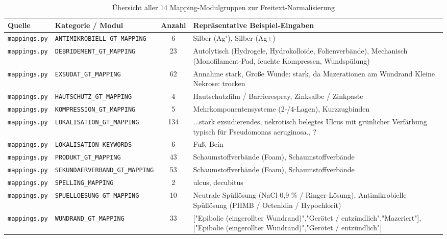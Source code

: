 \begin{table}[h!]
\centering
\caption{Übersicht aller 14 Mapping-Modulgruppen zur Freitext-Normalisierung}
\label{tab:mapping_uebersicht}
\begin{tabular}{|l|l|c|p{6cm}|}
\hline
\textbf{Quelle} & \textbf{Kategorie / Modul} & \textbf{Anzahl} & \textbf{Repräsentative Beispiel-Eingaben} \\ \hline
\texttt{mappings.py} & \texttt{ANTIMIKROBIELL\_GT\_MAPPING} & 6 & \small{Silber (Ag⁺), Silber (Ag+)} \\ \hline
\texttt{mappings.py} & \texttt{DEBRIDEMENT\_GT\_MAPPING} & 23 & \small{Autolytisch (Hydrogele, Hydrokolloide, Folienverbände), Mechanisch (Monofilament-Pad, feuchte Kompressen, Wundspülung)} \\ \hline
\texttt{mappings.py} & \texttt{EXSUDAT\_GT\_MAPPING} & 62 & \small{Annahme stark, Große Wunde: stark, da Mazerationen am Wundrand
Kleine Nekrose: trocken} \\ \hline
\texttt{mappings.py} & \texttt{HAUTSCHUTZ\_GT\_MAPPING} & 4 & \small{Hautschutzfilm / Barrierespray, Zinksalbe / Zinkpaste} \\ \hline
\texttt{mappings.py} & \texttt{KOMPRESSION\_GT\_MAPPING} & 5 & \small{Mehrkomponentensysteme (2-/4-Lagen), Kurzzugbinden} \\ \hline
\texttt{mappings.py} & \texttt{LOKALISATION\_GT\_MAPPING} & 134 & \small{...stark exsudierendes, nekrotisch belegtes Ulcus mit grünlicher Verfärbung typisch für Pseudomonas aeruginosa., ?} \\ \hline
\texttt{mappings.py} & \texttt{LOKALISATION\_KEYWORDS} & 6 & \small{Fuß, Bein} \\ \hline
\texttt{mappings.py} & \texttt{PRODUKT\_GT\_MAPPING} & 43 & \small{Schaumstoffverbände (Foam), Schaumstoffverbände} \\ \hline
\texttt{mappings.py} & \texttt{SEKUNDAERVERBAND\_GT\_MAPPING} & 53 & \small{Schaumstoffverbände (Foam), Schaumstoffverbände} \\ \hline
\texttt{mappings.py} & \texttt{SPELLING\_MAPPING} & 2 & \small{ulcus, decubitus} \\ \hline
\texttt{mappings.py} & \texttt{SPUELLOESUNG\_GT\_MAPPING} & 10 & \small{Neutrale Spüllösung (NaCl 0,9 \% / Ringer-Lösung), Antimikrobielle Spüllösung (PHMB / Octenidin / Hypochlorit)} \\ \hline
\texttt{mappings.py} & \texttt{WUNDRAND\_GT\_MAPPING} & 33 & \small{["Epibolie (eingerollter Wundrand)","Gerötet / entzündlich","Mazeriert"], ["Epibolie (eingerollter Wundrand)","Gerötet / entzündlich"]} \\ \hline

\end{tabular}
\end{table}
